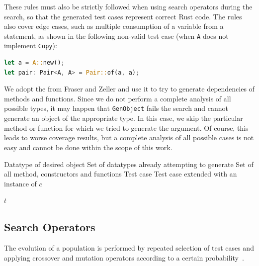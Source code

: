 \documentclass[paper=a4,%
  twoside,%
  BCOR4mm,%
  abstract=true,%
  toc=bibliography,%
  chapterprefix=true,%
  toc=bibliographynumbered,%
  open=right,%
  english,%
  pagesize=pdftex]{scrreprt}
\newcommand{\Desc}[2]{\State \makebox[2em][l]{#1}#2}
\begin{document}
These rules must also be strictly followed when using search operators during the search, so that the generated test cases represent correct Rust code. The rules also cover edge cases, such as multiple consumption of a variable from a statement, as shown in the following non-valid test case (when \lstinline{A} does not implement \lstinline{Copy}):
\begin{lstlisting}[language=Rust, style=boxed, caption={}]
let a = A::new();
let pair: Pair<A, A> = Pair::of(a, a);
\end{lstlisting}

We adopt the  from Fraser and Zeller and use it to try to generate dependencies of methods and functions. Since we do not perform a complete analysis of all possible types, it may happen that \lstinline{GenObject} fails the search and cannot generate an object of the appropriate type. In this case, we skip the particular method or function for which we tried to generate the argument. Of course, this leads to worse coverage results, but a complete analysis of all possible cases is not easy and cannot be done within the scope of this work.

\begin{algorithm}[t]
\caption{$GenObject(c, G, M, t)$}
\label{alg:genobject}
\begin{algorithmic}
\Input
  \Desc{$c$}{Datatype of desired object}
  \Desc{$G$}{Set of datatypes already attempting to generate}
  \Desc{$M$}{Set of all method, constructors and functions}
  \Desc{$t$}{Test case}
\EndInput
\Output
  \Desc{$t$}{Test case extended with an instance of $c$}
\EndOutput
{}

  \EndIf
\EndFor
{}
\State \Return $t$
\end{algorithmic}
\end{algorithm}

\subsection{Search Operators}
\label{sec:search-operators}
The evolution of a population is performed by repeated selection of test cases and applying crossover and mutation operators according to a certain probability~\cite{Fraser2012}.
\end{document}
